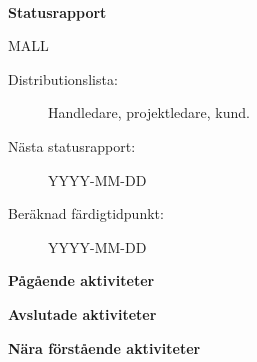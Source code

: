 \documentclass[titlepage, a4paper]{article}
\begin{document}
{\ }\vspace{5mm}

\centerline{\textbf{\Huge Statusrapport}}
\vspace{2mm}
\centerline{\LARGE MALL} %
\vspace{5mm}

\begin{description}
  \item[Distributionslista:] Handledare, projektledare, kund.	%
  \item[Nästa statusrapport:] YYYY-MM-DD	%
  \item[Beräknad färdigtidpunkt:] YYYY-MM-DD	%
\end{description}

\vspace{7mm}
\textbf{\Large Pågående aktiviteter}

\begin{statusrapport}
\end{statusrapport}
	
\vspace{7mm}
\textbf{\Large Avslutade aktiviteter}

\begin{statusrapport}
\end{statusrapport}

\vspace{7mm}
\textbf{\Large Nära förstående aktiviteter}
\end{document}
